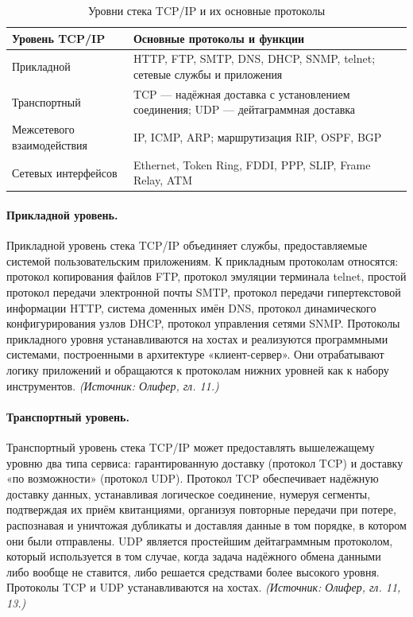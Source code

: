 \documentclass[a4paper,12pt]{article}
\begin{document}
\begin{table}[h]
\centering
\caption{Уровни стека TCP/IP и их основные протоколы}
\label{tab:tcpip-levels-detail}
\begin{tabular}{p{4cm}p{9cm}}
\toprule
\textbf{Уровень TCP/IP} & \textbf{Основные протоколы и функции} \\
\midrule
Прикладной & HTTP, FTP, SMTP, DNS, DHCP, SNMP, telnet; сетевые службы и приложения \\
Транспортный & TCP — надёжная доставка с установлением соединения; UDP — дейтаграммная доставка \\
Межсетевого взаимодействия & IP, ICMP, ARP; маршрутизация RIP, OSPF, BGP \\
Сетевых интерфейсов & Ethernet, Token Ring, FDDI, PPP, SLIP, Frame Relay, ATM \\
\bottomrule
\end{tabular}
\end{table}

\paragraph{Прикладной уровень.}
Прикладной уровень стека TCP/IP объединяет службы, предоставляемые системой пользовательским приложениям. К прикладным протоколам относятся: протокол копирования файлов FTP, протокол эмуляции терминала telnet, простой протокол передачи электронной почты SMTP, протокол передачи гипертекстовой информации HTTP, система доменных имён DNS, протокол динамического конфигурирования узлов DHCP, протокол управления сетями SNMP. Протоколы прикладного уровня устанавливаются на хостах и реализуются программными системами, построенными в архитектуре «клиент-сервер». Они отрабатывают логику приложений и обращаются к протоколам нижних уровней как к набору инструментов.
\textit{(Источник: Олифер, гл. 11.)}

\paragraph{Транспортный уровень.}
Транспортный уровень стека TCP/IP может предоставлять вышележащему уровню два типа сервиса: гарантированную доставку (протокол TCP) и доставку «по возможности» (протокол UDP). Протокол TCP обеспечивает надёжную доставку данных, устанавливая логическое соединение, нумеруя сегменты, подтверждая их приём квитанциями, организуя повторные передачи при потере, распознавая и уничтожая дубликаты и доставляя данные в том порядке, в котором они были отправлены. UDP является простейшим дейтаграммным протоколом, который используется в том случае, когда задача надёжного обмена данными либо вообще не ставится, либо решается средствами более высокого уровня. Протоколы TCP и UDP устанавливаются на хостах.
\textit{(Источник: Олифер, гл. 11, 13.)}
\end{document}
